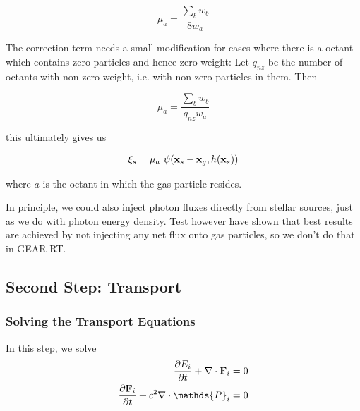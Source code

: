 \begin{equation}
\mu_a = \frac{\sum_b w_b}{8 w_a}
\end{equation}

The correction term needs a small modification for cases where there is a octant which contains zero
particles and hence zero weight: Let $q_{nz}$ be the number of octants with non-zero weight, i.e.
with non-zero particles in them. Then

\begin{equation}
	\mu_a = \frac{\sum_b w_b}{q_{nz} w_a} \label{eq:isotropy-correction-with-zero}
\end{equation}


this ultimately gives us

\begin{align}
    \xi_s = \mu_a \ \psi(\mathbf{x}_{s} - \mathbf{x}_{g}, h(\mathbf{x}_{s}))
\end{align}

where $a$ is the octant in which the gas particle resides.


In principle, we could also inject photon fluxes directly from stellar sources, just as we do with
photon energy density. Test however have shown that best results are achieved by not injecting any
net flux onto gas particles, so we don't do that in GEAR-RT.












\subsection{Second Step: Transport}\label{chap:transport-step}

\subsubsection{Solving the Transport Equations}

In this step, we solve
\begin{align}
    \DELDT{E_i} + \nabla \cdot \Fbf_i &= 0 \label{eq:homogenized-dEdt}\\
    \DELDT{\Fbf_i} + c^2 \nabla \cdot \mathds{P}_i &= 0 \label{eq:homogenized-dFdt}
\end{align}

